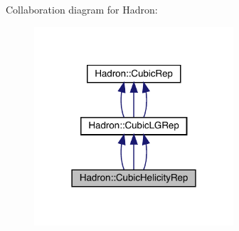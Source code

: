Collaboration diagram for Hadron\+:
\nopagebreak
\begin{figure}[H]
\begin{center}
\leavevmode
\includegraphics[width=210pt]{da/d6a/structHadron_1_1CubicHelicityRep__coll__graph}
\end{center}
\end{figure}
